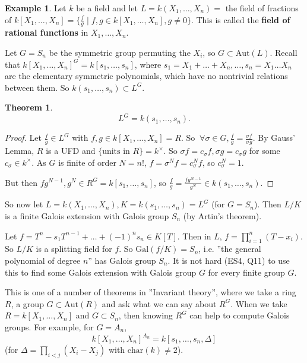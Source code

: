 \documentclass{article}
\theoremstyle{definition}
\newtheorem{theorem}{Theorem}[section]
\newtheorem{example}{Example}[section]
\begin{document}
\begin{example}
    Let $k$ be a field and let $L=k(X_1,\ldots,X_n)=$ the field of fractions of $k[X_1,\ldots,X_n] = \{\frac{f}{g} \mid f,g \in k[X_1,\ldots,X_n], g\neq 0\}$. This is called the \textbf{field of rational functions} in $X_1,\ldots,X_n$.
    \vspace{1mm}
    
    Let $G=S_n$ be the symmetric group permuting the $X_i$, so $G \subset \text{Aut}(L)$. Recall that $k[X_1,\ldots,X_n]^G  = k[s_1,\ldots,s_n]$, where $s_1=X_1+\ldots+X_n,\ldots, s_n = X_1\ldots X_n$ are the elementary symmetric polynomials, which have no nontrivial relations between them. So $k(s_1,\ldots,s_n) \subset L^G$.
\end{example}
\begin{theorem}
    \[
    L^G = k(s_1,\ldots,s_n).
    \]
\end{theorem}
\begin{proof}
    Let $\frac{f}{g} \in L^G$ with $f,g \in k[X_1,\ldots,X_n] = R$. So $~\forall \sigma \in G, \frac{f}{g} = \frac{\sigma f}{\sigma g}$. By Gauss' Lemma, $R$ is a UFD and $\{\text{units in }R\} = k^\times$. So $\sigma f = c_\sigma f, \sigma g = c_\sigma g$ for some $c_\sigma \in k^\times$. As $G$ is finite of order $N=n!$, $f = \sigma^N f = c_\sigma^N f$, so $c_{\sigma}^N = 1$.
    \vspace{1mm}

    But then $fg^{N-1}, g^N \in R^G = k[s_1,\ldots,s_n]$, so $\frac{f}{g}=\frac{fg^{N-1}}{g^N} \in k(s_1,\ldots,s_n)$.    
\end{proof}
So now let $L=k(X_1,\ldots,X_n), K=k(s_1,\ldots,s_n)=L^G$ (for $G=S_n$). Then $L/K$ is a finite Galois extension with Galois group $S_n$ (by Artin's theorem). 
\vspace{1mm}

Let $f=T^n - s_1T^{n-1} + \ldots + (-1)^n s_n \in K[T]$. Then in $L$, $f=\prod_{i=1}^{n} (T-x_i)$. So $L/K$ is a splitting field for $f$. So $\text{Gal}(f/K)=S_n$, i.e. ''the general polynomial of degree $n$'' has Galois group $S_n$. It is not hard (ES4, Q11) to use this to find some Galois extension with Galois group $G$ for every finite group $G$.
\vspace{1mm}

This is one of a number of theorems in ''Invariant theory'', where we take a ring $R$, a group $G \subset \text{Aut}(R)$ and ask what we can say about $R^G$. When we take $R=k[X_1,\ldots,X_n]$ and $G \subset S_n$, then knowing $R^G$ can help to compute Galois groups. For example, for $G=A_n$, 
\[
k[X_1,\ldots,X_n]^{A_n} = k[s_1,\ldots,s_n,\Delta]
\]
(for $\Delta=\prod_{i<j}^{} (X_i-X_j)$ with $\text{char}(k)\neq2$).
\end{document}
